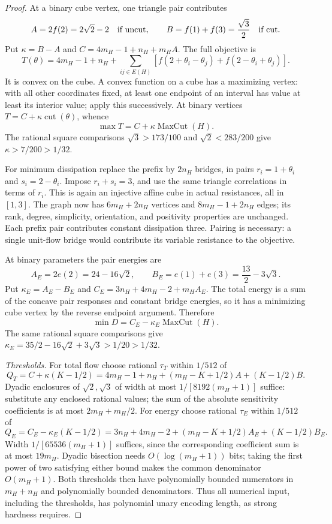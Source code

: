 \begin{proof}
At a binary cube vertex, one triangle pair contributes
\[
 A=2f(2)=2\sqrt2-2 \quad\hbox{if uncut},\qquad
 B=f(1)+f(3)=\frac{\sqrt3}{2} \quad\hbox{if cut}.
\]
Put $\kappa=B-A$ and $C=4m_H-1+n_H+m_HA$. The full objective is
\[
 T(\theta)=4m_H-1+n_H+
   \sum_{ij\in E(H)}[f(2+\theta_i-\theta_j)+f(2-\theta_i+\theta_j)].
\]
It is convex on the cube. A convex function on a cube has a maximizing
vertex: with all other coordinates fixed, at least one endpoint of an
interval has value at least its interior value; apply this successively.
At binary vertices $T=C+\kappa\operatorname{cut}(\theta)$, whence
\begin{equation}
 \max T=C+\kappa\operatorname{MaxCut}(H).
 \label{eq:a-corr-cut-flow}
\end{equation}
The rational square comparisons
$\sqrt3>173/100$ and $\sqrt2<283/200$ give
$\kappa>7/200>1/32$.

For minimum dissipation replace the prefix by $2n_H$ bridges, in pairs
$r_i=1+\theta_i$ and $s_i=2-\theta_i$. Impose $r_i+s_i=3$, and use the
same triangle correlations in terms of $r_i$. This is again an
injective affine cube in actual resistances, all in $[1,3]$. The graph
now has $6m_H+2n_H$ vertices and $8m_H-1+2n_H$ edges; its rank, degree,
simplicity, orientation, and positivity properties are unchanged. Each
prefix pair contributes constant dissipation three. Pairing is necessary:
a single unit-flow bridge would contribute its variable resistance to
the objective.

At binary parameters the pair energies are
\[
 A_E=2e(2)=24-16\sqrt2,
 \qquad B_E=e(1)+e(3)=\frac{13}{2}-3\sqrt3.
\]
Put $\kappa_E=A_E-B_E$ and $C_E=3n_H+4m_H-2+m_HA_E$.
The total energy is a sum of the concave pair responses and constant
bridge energies, so it has a minimizing cube vertex by the reverse
endpoint argument. Therefore
\begin{equation}
 \min D=C_E-\kappa_E\operatorname{MaxCut}(H).
 \label{eq:a-corr-cut-energy}
\end{equation}
The same rational square comparisons give
$\kappa_E=35/2-16\sqrt2+3\sqrt3>1/20>1/32$.

\emph{Thresholds.} For total flow choose rational $\tau_T$ within
$1/512$ of
\[
 Q_T=C+\kappa(K-1/2)
 =4m_H-1+n_H+(m_H-K+1/2)A+(K-1/2)B.
\]
Dyadic enclosures of $\sqrt2,\sqrt3$ of width at most
$1/[8192(m_H+1)]$ suffice: substitute any enclosed rational values;
the sum of the absolute sensitivity coefficients is at most
$2m_H+m_H/2$. For energy choose rational $\tau_E$ within $1/512$ of
\[
 Q_E=C_E-\kappa_E(K-1/2)
 =3n_H+4m_H-2+(m_H-K+1/2)A_E+(K-1/2)B_E.
\]
Width $1/[65536(m_H+1)]$ suffices, since the corresponding coefficient
sum is at most $19m_H$. Dyadic bisection needs $O(\log(m_H+1))$ bits;
taking the first power of two satisfying either bound makes the common
denominator $O(m_H+1)$. Both thresholds then have polynomially bounded
numerators in $m_H+n_H$ and polynomially bounded denominators. Thus all
numerical input, including the thresholds, has polynomial unary encoding
length, as strong hardness requires.


\end{proof}
